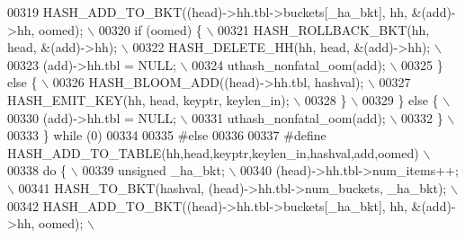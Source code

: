 \begin{DoxyCode}
{{{00319 \textcolor{preprocessor}{    HASH\_ADD\_TO\_BKT((head)->hh.tbl->buckets[\_ha\_bkt], hh, &(add)->hh, oomed);    \(\backslash\)}
00320 \textcolor{preprocessor}{    if (oomed) \{                                                                 \(\backslash\)}
00321 \textcolor{preprocessor}{      HASH\_ROLLBACK\_BKT(hh, head, &(add)->hh);                                   \(\backslash\)}
00322 \textcolor{preprocessor}{      HASH\_DELETE\_HH(hh, head, &(add)->hh);                                      \(\backslash\)}
00323 \textcolor{preprocessor}{      (add)->hh.tbl = NULL;                                                      \(\backslash\)}
00324 \textcolor{preprocessor}{      uthash\_nonfatal\_oom(add);                                                  \(\backslash\)}
00325 \textcolor{preprocessor}{    \} else \{                                                                     \(\backslash\)}
00326 \textcolor{preprocessor}{      HASH\_BLOOM\_ADD((head)->hh.tbl, hashval);                                   \(\backslash\)}
00327 \textcolor{preprocessor}{      HASH\_EMIT\_KEY(hh, head, keyptr, keylen\_in);                                \(\backslash\)}
00328 \textcolor{preprocessor}{    \}                                                                            \(\backslash\)}
00329 \textcolor{preprocessor}{  \} else \{                                                                       \(\backslash\)}
00330 \textcolor{preprocessor}{    (add)->hh.tbl = NULL;                                                        \(\backslash\)}
00331 \textcolor{preprocessor}{    uthash\_nonfatal\_oom(add);                                                    \(\backslash\)}
00332 \textcolor{preprocessor}{  \}                                                                              \(\backslash\)}
00333 \textcolor{preprocessor}{\} while (0)}
00334 
00335 \textcolor{preprocessor}{#else}
00336 
00337 \textcolor{preprocessor}{#define HASH\_ADD\_TO\_TABLE(hh,head,keyptr,keylen\_in,hashval,add,oomed)            \(\backslash\)}
00338 \textcolor{preprocessor}{do \{                                                                             \(\backslash\)}
00339 \textcolor{preprocessor}{  unsigned \_ha\_bkt;                                                              \(\backslash\)}
00340 \textcolor{preprocessor}{  (head)->hh.tbl->num\_items++;                                                   \(\backslash\)}
00341 \textcolor{preprocessor}{  HASH\_TO\_BKT(hashval, (head)->hh.tbl->num\_buckets, \_ha\_bkt);                    \(\backslash\)}
00342 \textcolor{preprocessor}{  HASH\_ADD\_TO\_BKT((head)->hh.tbl->buckets[\_ha\_bkt], hh, &(add)->hh, oomed);      \(\backslash\)}
}}}
\end{DoxyCode}
